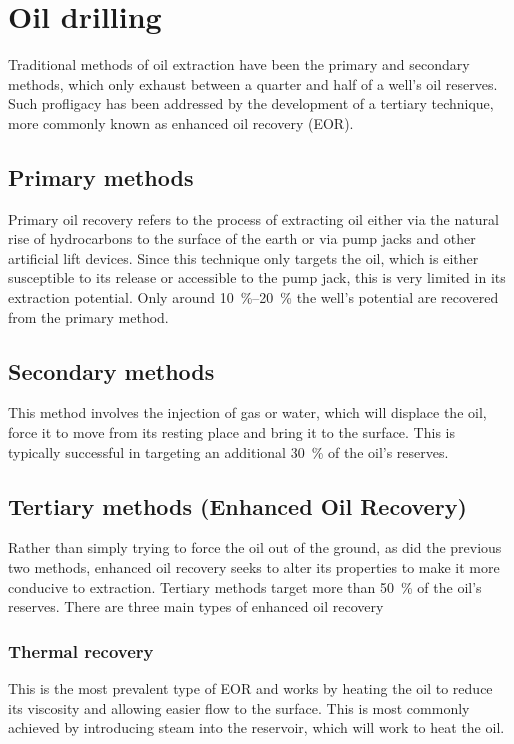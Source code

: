 \section{Oil drilling}
Traditional methods of oil extraction have been the primary and secondary methods, which only exhaust between a quarter and half of a well’s oil reserves.
Such profligacy has been addressed by the development of a tertiary technique, more commonly known as enhanced oil recovery (EOR).

\subsection{Primary methods}
Primary oil recovery refers to the process of extracting oil either via the natural rise of hydrocarbons to the surface of the earth or via pump jacks and other artificial lift devices.
Since this technique only targets the oil, which is either susceptible to its release or accessible to the pump jack, this is very limited in its extraction potential.
Only around \SIrange{10}{20}{\percent} the well’s potential are recovered from the primary method.

\subsection{Secondary methods}
This method involves the injection of gas or water, which will displace the oil, force it to move from its resting place and bring it to the surface.
This is typically successful in targeting an additional \SI{30}{\percent} of the oil’s reserves.

\subsection{Tertiary methods (Enhanced Oil Recovery)}
Rather than simply trying to force the oil out of the ground, as did the previous two methods, enhanced oil recovery seeks to alter its properties to make it more conducive to extraction.
Tertiary methods target more than \SI{50}{\percent} of the oil’s reserves.
There are three main types of enhanced oil recovery

\subsubsection{Thermal recovery}
This is the most prevalent type of EOR and works by heating the oil to reduce its viscosity and allowing easier flow to the surface.
This is most commonly achieved by introducing steam into the reservoir, which will work to heat the oil.

